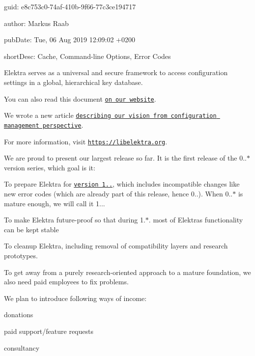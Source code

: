 
\begin{DoxyItemize}
\item guid\+: e8c753c0-\/74af-\/410b-\/9f66-\/77c3ce194717
\item author\+: Markus Raab
\item pub\+Date\+: Tue, 06 Aug 2019 12\+:09\+:02 +0200
\item short\+Desc\+: Cache, Command-\/line Options, Error Codes
\end{DoxyItemize}

Elektra serves as a universal and secure framework to access configuration settings in a global, hierarchical key database.

You can also read this document \href{https://www.libelektra.org/news/0.9.0-release}{\tt on our website}.

We wrote a new article \href{https://www.libelektra.org/docgettingstarted/vision}{\tt describing our vision from configuration management perspective}.

For more information, visit \href{https://libelektra.org}{\tt https\+://libelektra.\+org}.

We are proud to present our largest release so far. It is the first release of the 0..$\ast$ version series, which goal is it\+:


\begin{DoxyItemize}
\item To prepare Elektra for \href{https://github.com/ElektraInitiative/libelektra/milestone/12}{\tt version 1..}, which includes incompatible changes like new error codes (which are already part of this release, hence 0..). When 0..$\ast$ is mature enough, we will call it 1...
\item To make Elektra future-\/proof so that during 1.$\ast$. most of Elektra\textquotesingle{}s functionality can be kept stable
\item To cleanup Elektra, including removal of compatibility layers and research prototypes.
\end{DoxyItemize}

To get away from a purely research-\/oriented approach to a mature foundation, we also need paid employees to fix problems.

We plan to introduce following ways of income\+:


\begin{DoxyEnumerate}
\item donations
\item paid support/feature requests
\item consultancy
\end{DoxyEnumerate}

